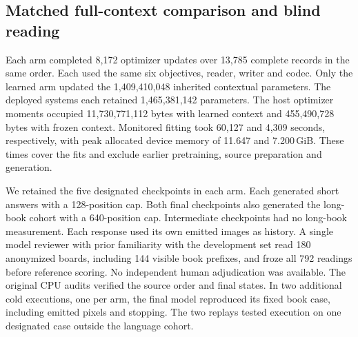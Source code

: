 \subsection*{Matched full-context comparison and blind reading}
Each arm completed 8,172 optimizer updates over 13,785 complete records in
the same order. Each used the same six objectives, reader, writer and codec.
Only the learned arm updated the 1,409,410,048 inherited contextual parameters.
The deployed systems each retained 1,465,381,142 parameters. The host optimizer
moments occupied 11,730,771,112 bytes with learned context and 455,490,728 bytes
with frozen context. Monitored fitting took 60,127 and 4,309 seconds, respectively,
with peak allocated device memory of 11.647 and 7.200\,GiB. These times cover
the fits and exclude earlier pretraining, source preparation and generation.

We retained the five designated checkpoints in each arm. Each generated short
answers with a 128-position cap. Both final checkpoints also generated the
long-book cohort with a 640-position cap. Intermediate checkpoints had no
long-book measurement. Each response used its own emitted images as history.
A single model reviewer with prior familiarity with the development set read
180 anonymized boards, including 144 visible book prefixes, and froze all 792
readings before reference scoring. No independent human adjudication was
available. The original CPU audits verified the source order and final states.
In two additional cold executions, one per arm, the final model reproduced its
fixed book case, including emitted pixels and stopping. The two replays tested
execution on one designated case outside the language cohort.
